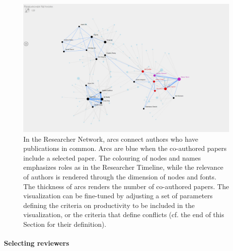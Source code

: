 
\begin{figure}[!ht]
    \centering
    \includegraphics[width=\textwidth]{fig/researcher_network.png}
    \caption{In the Researcher Network, arcs connect authors who have publications in common.  Arcs are blue when the co-authored papers include a selected paper. The colouring of nodes and names emphasizes roles as in the Researcher Timeline, while the relevance of authors is rendered through the dimension of nodes and fonts. The thickness of arcs renders the number of co-authored papers. The visualization can be fine-tuned by adjusting a set of parameters defining the criteria on productivity to be included in the visualization, or the criteria that define conflicts (cf. the end of this Section for their definition).}%
    \label{fig:communities}
\end{figure}

\paragraph*{Selecting reviewers} 

